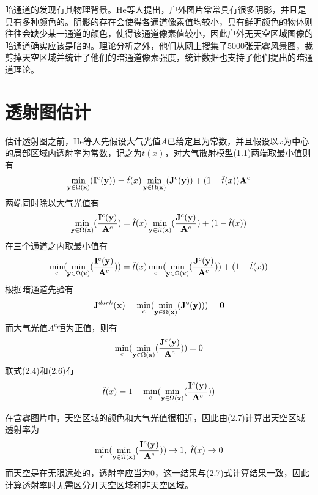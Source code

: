 \documentclass[a4paper, 12pt, oneside]{report}
\begin{document}
{暗通道的发现有其物理背景。He等人提出，户外图片常常具有很多阴影，并且是具有多种颜色的。阴影的存在会使得各通道像素值均较小，具有鲜明颜色的物体则往往会缺少某一通道的颜色，使得该通道像素值较小，因此户外无天空区域图像的暗通道确实应该是暗的。理论分析之外，他们从网上搜集了5000张无雾风景图，裁剪掉天空区域并统计了他们的暗通道像素强度，统计数据也支持了他们提出的暗通道理论。

\section{透射图估计\quad }
估计透射图之前，He等人先假设大气光值$A$已给定且为常数，并且假设以$x$为中心的局部区域内透射率为常数，记之为$\tilde{t}(x)$，对大气散射模型(1.1)两端取最小值则有
\begin{equation}
\min_{{\bf y} \in \Omega({\bf x})}({\bf I}^c({\bf y})) = \tilde{t}(x) \min_{{\bf y} \in \Omega({\bf x})}({\bf J}^c({\bf y})) + (1-\tilde{t}(x)){\bf A}^c
\end{equation}
两端同时除以大气光值有
\begin{equation}
\min_{{\bf y} \in \Omega({\bf x})}(\frac{{\bf I}^c({\bf y})}{{\bf A}^c}) = \tilde{t}(x)\min_{{\bf y} \in \Omega({\bf x})}(\frac{{\bf J}^c({\bf y})}{{\bf A}^c}) + (1-\tilde{t}(x))
\end{equation}
在三个通道之内取最小值有
\begin{equation}
\min_c(\min_{{\bf y} \in \Omega({\bf x})}(\frac{{\bf I}^c({\bf y})}{{\bf A}^c})) = \tilde{t}(x)\min_c(\min_{{\bf y} \in \Omega({\bf x})}(\frac{{\bf J}^c({\bf y})}{{\bf A}^c})) + (1-\tilde{t}(x))
\end{equation}
根据暗通道先验有
\begin{equation}
{\bf J}^{dark}{\bf (x)} = \min_c(\min_{{\bf y} \in \Omega({\bf x})}(\bf J^c(y))) = 0
\end{equation}
而大气光值$A^c$恒为正值，则有
\begin{equation}
\min_c(\min_{{\bf y} \in \Omega({\bf x})}(\frac{{\bf J}^c({\bf y})}{{\bf A}^c})) = 0
\end{equation}
联式(2.4)和(2.6)有
\begin{equation}
\tilde{t}(x) = 1 - \min_c(\min_{{\bf y} \in \Omega({\bf x})}(\frac{{\bf I}^c({\bf y})}{{\bf A}^c}))
\end{equation}

在含雾图片中，天空区域的颜色和大气光值很相近，因此由(2.7)计算出天空区域透射率为
$$\min_c(\min_{{\bf y} \in \Omega({\bf x})}(\frac{{\bf I}^c({\bf y})}{{\bf A}^c})) \rightarrow 1,\ \tilde{t}(x) \rightarrow 0$$
而天空是在无限远处的，透射率应当为0，这一结果与(2.7)式计算结果一致，因此计算透射率时无需区分开天空区域和非天空区域。

}
\end{document}
